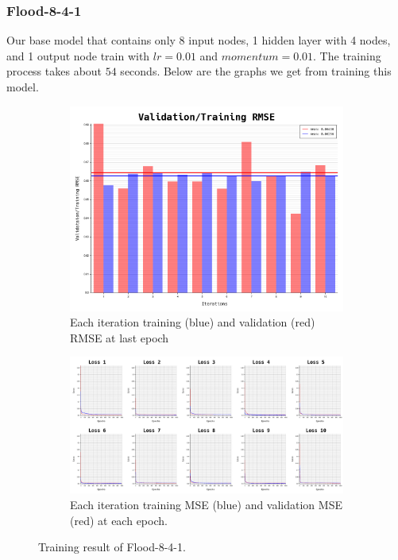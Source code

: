 \documentclass{article}
\begin{document}
\subsubsection*{Flood-8-4-1}
Our base model that contains only 8 input nodes, 1 hidden layer with 4 nodes, and 1 output node train with $lr = 0.01$ and $momentum = 0.01$.
The training process takes about $54$ seconds. Below are the graphs we get from training this model. 
\begin{figure}[ht]
	\begin{subfigure}{\textwidth}
		\centering
		\includegraphics[scale=0.3]{flood-8-4-1/cv_l}
		\caption{Each iteration training (blue) and validation (red) RMSE at last epoch}
		\label{fig:2a}
	\end{subfigure}
	\begin{subfigure}{\textwidth}
		\includegraphics[width=\textwidth]{flood-8-4-1/loss}
		\caption{Each iteration training MSE (blue) and validation MSE (red) at each epoch.}
		\label{fig:2b}
	\end{subfigure}
	\caption{Training result of Flood-8-4-1.}
	\label{fig:2}
\end{figure}
\FloatBarrier
\end{document}
